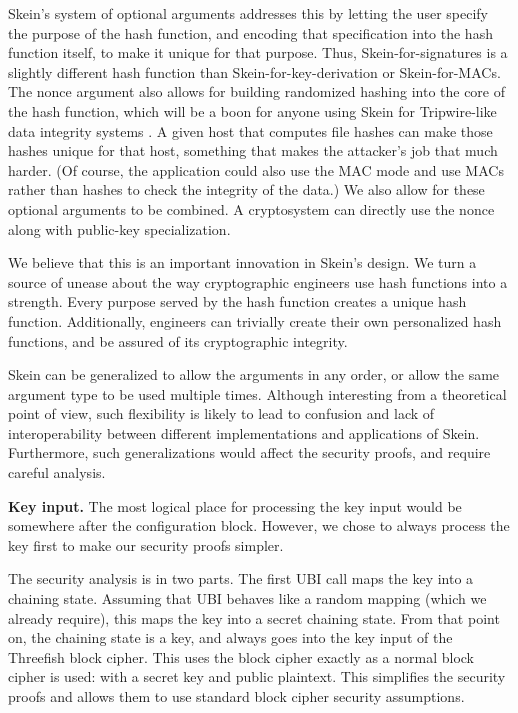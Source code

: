 \documentclass[11pt,twoside]{article}
\begin{document}
Skein's system of optional arguments addresses this by letting the user specify the purpose of the hash function, and encoding that specification into the hash function itself, to make it unique for that purpose.  Thus, Skein-for-signatures is a slightly different hash function than Skein-for-key-derivation or Skein-for-MACs. The nonce argument also allows for building randomized hashing into the core of the hash function, which will be a boon for anyone using Skein for Tripwire-like data integrity systems \cite{KS94}.  A given host that computes file hashes can make those hashes unique for that host, something that makes the attacker's job that much harder. (Of course, the application could also use the MAC mode and use MACs rather than hashes to check the integrity of the data.) We also allow for these optional arguments to be combined.  A cryptosystem can directly use the nonce along with public-key specialization.

We believe that this is an important innovation in Skein's design. We turn a source of unease about the way cryptographic engineers use hash functions into a strength.  Every purpose served by the hash function creates a unique hash function.  Additionally, engineers can trivially create their own personalized hash functions, and be assured of its cryptographic integrity.

Skein can be generalized to allow the arguments in any order, or allow the same argument type to be used multiple times. Although interesting from a theoretical point of view, such flexibility is likely to lead to confusion and lack of interoperability between different implementations and applications of Skein. Furthermore, such generalizations would affect the security proofs, and require careful analysis.

{\bf Key input.}  The most logical place for processing the key input would be somewhere after the configuration block. However, we chose to always process the key first to make our security proofs simpler.

The security analysis is in two parts. The first UBI call maps the key into a chaining state. Assuming that UBI behaves like a random mapping (which we already require), this maps the key into a secret chaining state. From that point on, the chaining state is a key, and always goes into the key input of the Threefish block cipher. This uses the block cipher exactly as a normal block cipher is used: with a secret key and public plaintext. This simplifies the security proofs and allows them to use standard block cipher security assumptions.
\end{document}
